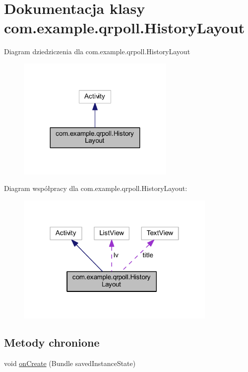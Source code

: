 \hypertarget{classcom_1_1example_1_1qrpoll_1_1_history_layout}{\section{Dokumentacja klasy com.\+example.\+qrpoll.\+History\+Layout}
\label{classcom_1_1example_1_1qrpoll_1_1_history_layout}
}


Diagram dziedziczenia dla com.\+example.\+qrpoll.\+History\+Layout
\nopagebreak
\begin{figure}[H]
\begin{center}
\leavevmode
\includegraphics[width=215pt]{classcom_1_1example_1_1qrpoll_1_1_history_layout__inherit__graph}
\end{center}
\end{figure}


Diagram współpracy dla com.\+example.\+qrpoll.\+History\+Layout\+:
\nopagebreak
\begin{figure}[H]
\begin{center}
\leavevmode
\includegraphics[width=274pt]{classcom_1_1example_1_1qrpoll_1_1_history_layout__coll__graph}
\end{center}
\end{figure}
\subsection*{Metody chronione}
\begin{DoxyCompactItemize}
\item 
void \hyperlink{classcom_1_1example_1_1qrpoll_1_1_history_layout_a693cf48cd1e688ab4bacfd5ce04f26c4}{on\+Create} (Bundle saved\+Instance\+State)
\end{DoxyCompactItemize}
